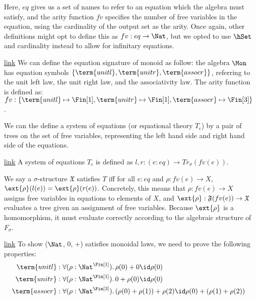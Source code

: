 Here, $eq$ gives us a set of names to refer to an equation which
the algebra must satisfy, and the arity function $fv$ specifies the 
number of free variables in the equation, using the cardinality of the
output set as the arity. Once again, other definitions might opt to
define this as $fv : eq \to \Nat$, but we opted to use $\hSet$ and
cardinality instead to allow for infinitary equations.

\begin{example}{\href{https://windtfw.com/agda-symmetries/Cubical.Structures.Set.Desc.Mon.html#1684}{link}}
We can define the equation signature of monoid as follow: the algebra
$\Mon$ has equation symbols $\{\term{unitl}, \term{unitr}, \term{assocr}\}$,
referring to the unit left law, the unit right law, and the associativity law.
The arity function is defined as:
$fv : \{ \term{unitl} \mapsto \Fin[1], \term{unitr} \mapsto \Fin[1], \term{assocr} \mapsto \Fin[3] \}$.
\end{example}

We can the define a system of equations (or equational theory $T_\epsilon$)
by a pair of trees on the set of free variables, representing the
left hand side and right hand side of the equations.
\begin{definition}{\href{https://windtfw.com/agda-symmetries/Cubical.Structures.Eq.html#1499}{link}}
A system of equations $T_\epsilon$ is defined as
$l, r : (e : eq) \to Tr_\sigma(fv(e))$.
\end{definition}

We say a $\sigma$-structure $\mathfrak{X}$ satisfies $T$
iff for all $e : eq$ and
$\rho : fv(e) \to X$, $\ext{\rho}(l(e)) = \ext{\rho}(r(e))$.
Concretely, this means that $\rho : fv(e) \to X$ assigns
free variables in equations to elements of $X$, and
$\ext{\rho} : \mathfrak{F}(fv(e)) \to \mathfrak{X}$ evaluates
a tree given an assignment of free variables. Because $\ext{\rho}$
is a homomorphism, it must evaluate correctly according to the
algebraic structure of $F_\sigma$.

\begin{example}{\href{https://windtfw.com/agda-symmetries/Cubical.Structures.Set.Desc.Mon.html#6382}{link}}
To show ($\Nat$, 0, +) satisfies monoidal laws, we need to prove
the following properties:
\begin{align*}
\term{unitl}  & : \forall (\rho : \Nat^{\Fin[1]}). \, \rho(0) + 0 \id \rho(0) \\
\term{unitr}  & : \forall (\rho : \Nat^{\Fin[1]}). \, 0 + \rho(0) \id \rho(0) \\
\term{assocr} & : \forall (\rho : \Nat^{\Fin[3]}). \, (\rho(0) + \rho(1)) + \rho(2) \id \rho(0) + (\rho(1) + \rho(2))
\end{align*} 
\end{example}

